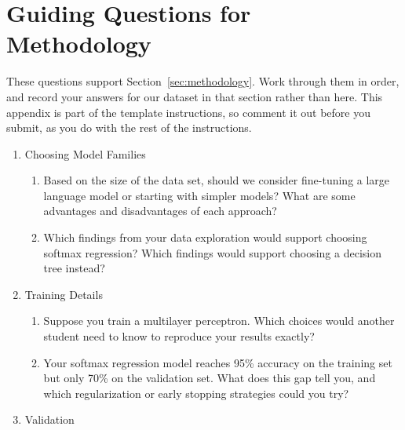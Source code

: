 \documentclass[12pt]{article}
\begin{document}
\section{Guiding Questions for Methodology}\label{app:methodology}

These questions support Section~\ref{sec:methodology}. Work through them in order, and
record your answers for our dataset in that section rather than here. This appendix is
part of the template instructions, so comment it out before you submit, as you do with
the rest of the instructions.

\begin{enumerate}

\item Choosing Model Families

\begin{enumerate}

\item Based on the size of the data set, should we consider fine-tuning a large language
  model or starting with simpler models? What are some advantages and disadvantages of
  each approach?

\item Which findings from your data exploration would support choosing softmax
  regression? Which findings would support choosing a decision tree instead?

\end{enumerate}

\item Training Details

\begin{enumerate}

\item Suppose you train a multilayer perceptron. Which choices would another student
  need to know to reproduce your results exactly?

\item Your softmax regression model reaches 95\% accuracy on the training set but only
  70\% on the validation set. What does this gap tell you, and which regularization or
  early stopping strategies could you try?

\end{enumerate}

\item Validation

\begin{enumerate}


\end{enumerate}
\end{enumerate}
\end{document}

